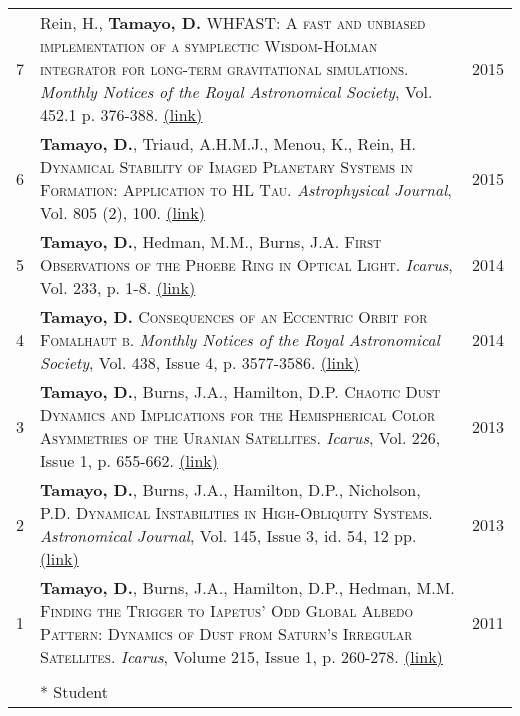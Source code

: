 \documentclass[10pt]{article} %
\begin{document}
{\begin{tabular}{>{\hfill}r|p{14.3cm}l}
7 & Rein, H., {\bf Tamayo, D.} \textsc{WHFAST: A fast and unbiased implementation of a symplectic Wisdom-Holman integrator for long-term gravitational simulations}. {\it Monthly Notices of the Royal Astronomical Society}, Vol. 452.1 p. 376-388. \href{http://arxiv.org/abs/1506.01084}{(link)} & 2015 \\

6 & {\bf Tamayo, D.}, Triaud, A.H.M.J., Menou, K., Rein, H. \textsc{Dynamical Stability of Imaged Planetary Systems in Formation:  Application to HL Tau}. {\it Astrophysical Journal}, Vol. 805 (2), 100. \href{http://arxiv.org/abs/1502.05099}{(link)} & 2015 \\

5 & {\bf Tamayo, D.}, Hedman, M.M., Burns, J.A. \textsc{First Observations of the Phoebe Ring in Optical Light}. {\it Icarus}, Vol. 233, p. 1-8. \href{http://arxiv.org/abs/1401.6166}{(link)}& 2014  \\

4 & {\bf Tamayo, D.} \textsc{Consequences of an Eccentric Orbit for Fomalhaut b}. {\it Monthly Notices of the Royal Astronomical Society}, Vol. 438, Issue 4, p. 3577-3586. \href{http://arxiv.org/abs/1312.7020}{(link)} & 2014 \\

3 & {\bf Tamayo, D.}, Burns, J.A., Hamilton, D.P. \textsc{Chaotic Dust Dynamics and Implications for the Hemispherical Color Asymmetries of the Uranian Satellites}. {\it Icarus}, Vol. 226, Issue 1, p. 655-662. \href{http://arxiv.org/abs/1306.3973}{(link)} & 2013 \\ 

2 & {\bf Tamayo, D.}, Burns, J.A., Hamilton, D.P., Nicholson, P.D. \textsc{Dynamical Instabilities in High-Obliquity Systems}. {\it Astronomical Journal}, Vol. 145, Issue 3, id. 54, 12 pp. \href{http://arxiv.org/abs/1212.0028}{(link)} & 2013 \\

1 & {\bf Tamayo, D.}, Burns, J.A., Hamilton, D.P., Hedman, M.M. \textsc{Finding the Trigger to Iapetus' Odd Global Albedo Pattern: Dynamics of Dust from Saturn's Irregular Satellites}. {\it Icarus}, Volume 215, Issue 1, p. 260-278. \href{http://arxiv.org/abs/1106.1893}{(link)} & 2011 \\

\multicolumn{3}{c}{} \\

& * Student
\end{tabular}

}
\end{document}
